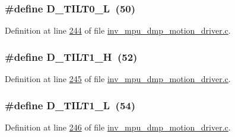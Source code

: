 \subsubsection[{\texorpdfstring{D\+\_\+\+T\+I\+L\+T0\+\_\+L}{D_TILT0_L}}]{\setlength{\rightskip}{0pt plus 5cm}\#define D\+\_\+\+T\+I\+L\+T0\+\_\+L~(50)}\hypertarget{group___d_r_i_v_e_r_s_ga6c85fceb5f74a918b0399d0307158ff7}{}\label{group___d_r_i_v_e_r_s_ga6c85fceb5f74a918b0399d0307158ff7}


Definition at line \hyperlink{inv__mpu__dmp__motion__driver_8c_source_l00244}{244} of file \hyperlink{inv__mpu__dmp__motion__driver_8c_source}{inv\+\_\+mpu\+\_\+dmp\+\_\+motion\+\_\+driver.\+c}.

\subsubsection[{\texorpdfstring{D\+\_\+\+T\+I\+L\+T1\+\_\+H}{D_TILT1_H}}]{\setlength{\rightskip}{0pt plus 5cm}\#define D\+\_\+\+T\+I\+L\+T1\+\_\+H~(52)}\hypertarget{group___d_r_i_v_e_r_s_ga4e1a6f62758ed17f6f950a15dae3f71f}{}\label{group___d_r_i_v_e_r_s_ga4e1a6f62758ed17f6f950a15dae3f71f}


Definition at line \hyperlink{inv__mpu__dmp__motion__driver_8c_source_l00245}{245} of file \hyperlink{inv__mpu__dmp__motion__driver_8c_source}{inv\+\_\+mpu\+\_\+dmp\+\_\+motion\+\_\+driver.\+c}.

\subsubsection[{\texorpdfstring{D\+\_\+\+T\+I\+L\+T1\+\_\+L}{D_TILT1_L}}]{\setlength{\rightskip}{0pt plus 5cm}\#define D\+\_\+\+T\+I\+L\+T1\+\_\+L~(54)}\hypertarget{group___d_r_i_v_e_r_s_ga4e42a147afc872019b8affbbe545e233}{}\label{group___d_r_i_v_e_r_s_ga4e42a147afc872019b8affbbe545e233}


Definition at line \hyperlink{inv__mpu__dmp__motion__driver_8c_source_l00246}{246} of file \hyperlink{inv__mpu__dmp__motion__driver_8c_source}{inv\+\_\+mpu\+\_\+dmp\+\_\+motion\+\_\+driver.\+c}.

